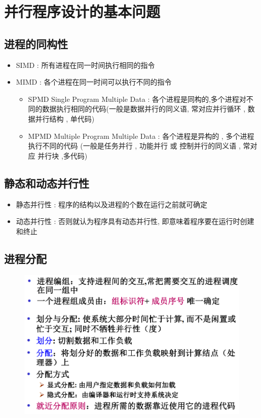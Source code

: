 \documentclass[UTF8,a4paper]{ctexart}
\begin{document}
\section{并行程序设计的基本问题}
\subsection{进程的同构性}
\begin{itemize}
  \item SIMD : 所有进程在同一时间执行相同的指令
  \item MIMD : 各个进程在同一时间可以执行不同的指令
  \begin{itemize}
    \item SPMD Single Program Multiple Data : 各个进程是同构的,多个进程对不同的数据执行相同的代码(一般是数据并行的同义语, 常对应并行循环 , 数据并行结构 , 单代码)
    \item MPMD Multiple Program Multiple Data : 各个进程是异构的 , 多个进程执行不同的代码 (一般是任务并行 , 功能并行 或 控制并行的同义语 , 常对应 并行块 ,多代码)
  \end{itemize}
\end{itemize}

\subsection{静态和动态并行性}
\begin{itemize}
  \item 静态并行性 : 程序的结构以及进程的个数在运行之前就可确定
  \item 动态并行性 : 否则就认为程序具有动态并行性, 即意味着程序要在运行时创建和终止
\end{itemize}

\subsection{进程分配}
\begin{figure}[H]
  \centering
  \includegraphics[scale = 0.3]{assets/ParallelComputing_424f5.png}
\end{figure}
\end{document}
